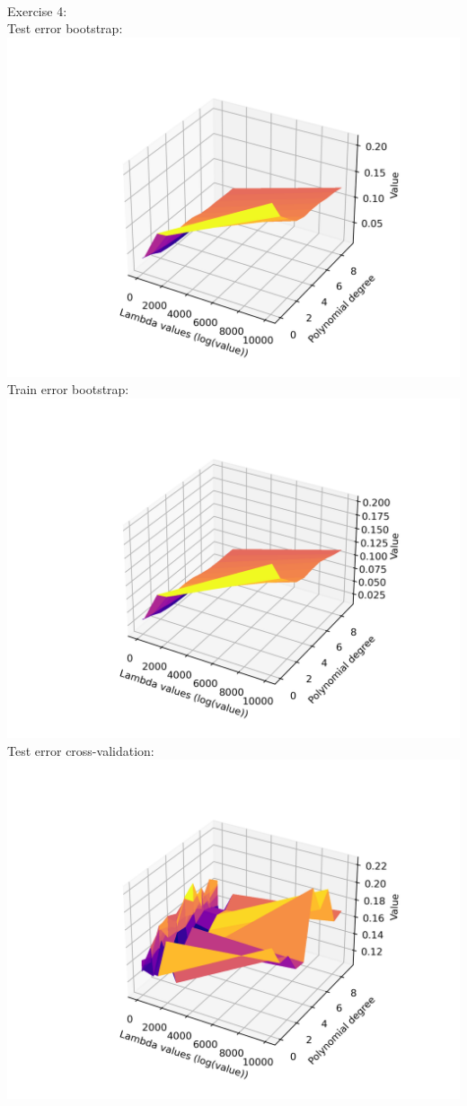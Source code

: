 \documentclass[12pt, letterpaper, twoside]{article}
\begin{document}
\ \\
Exercise 4:\\
Test error bootstrap:\\
\includegraphics[scale=0.6]{"ex4_testerror_bootstrap.png"}\\
Train error bootstrap:\\
\includegraphics[scale=0.6]{"ex4_traningerror_bootstrap.png"}\\
Test error cross-validation:\\
\includegraphics[scale=0.6]{"ex4_testerror_cv.png"}\\
\end{document}
